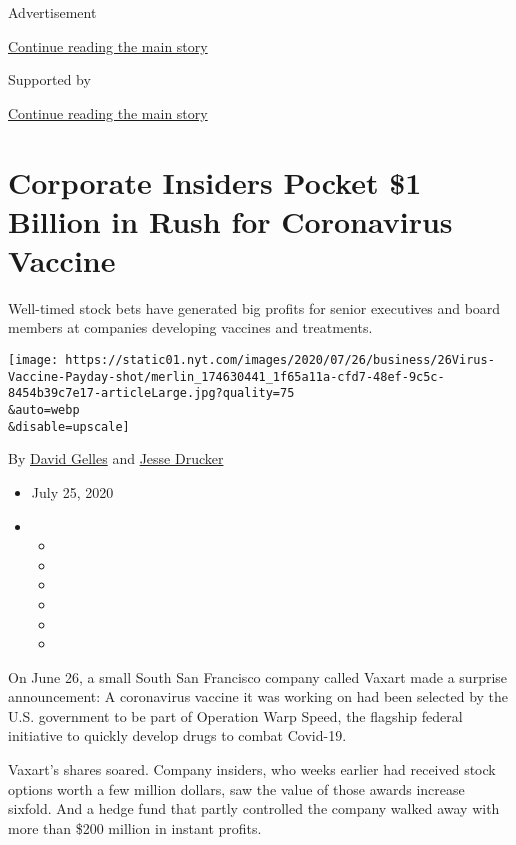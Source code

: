 Advertisement

\protect\hyperlink{after-top}{Continue reading the main story}

Supported by

\protect\hyperlink{after-sponsor}{Continue reading the main story}

\hypertarget{corporate-insiders-pocket-1-billion-in-rush-for-coronavirus-vaccine}{%
\section{Corporate Insiders Pocket \$1 Billion in Rush for Coronavirus
Vaccine}\label{corporate-insiders-pocket-1-billion-in-rush-for-coronavirus-vaccine}}

Well-timed stock bets have generated big profits for senior executives
and board members at companies developing vaccines and treatments.

\texttt{[image: https://static01.nyt.com/images/2020/07/26/business/26Virus-Vaccine-Payday-shot/merlin\_174630441\_1f65a11a-cfd7-48ef-9c5c-8454b39c7e17-articleLarge.jpg?quality=75\\\&auto=webp\\\&disable=upscale]}

By \href{https://www.nytimes.com/by/david-gelles}{David Gelles} and
\href{https://www.nytimes.com/by/jesse-drucker}{Jesse Drucker}

\begin{itemize}
\item
  July 25, 2020
\item
  \begin{itemize}
  \item
  \item
  \item
  \item
  \item
  \item
  \end{itemize}
\end{itemize}

On June 26, a small South San Francisco company called Vaxart made a
surprise announcement: A coronavirus vaccine it was working on had been
selected by the U.S. government to be part of Operation Warp Speed, the
flagship federal initiative to quickly develop drugs to combat Covid-19.

Vaxart's shares soared. Company insiders, who weeks earlier had received
stock options worth a few million dollars, saw the value of those awards
increase sixfold. And a hedge fund that partly controlled the company
walked away with more than \$200 million in instant profits.

